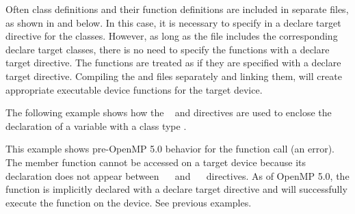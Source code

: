 
\begin{figure}[t!]
\end{figure}

Often class definitions and their function definitions are included in separate files,
as shown in  and  below.
In this case, it is necessary to specify in a declare target directive for the classes.
However, as long as the  file includes the corresponding declare target classes,
there is no need to specify the functions with a declare target directive.
The functions are treated as if they are specified with a declare target directive.
Compiling the  and  files 
separately and linking them, will create appropriate executable device functions for the target device.

\smallskip
{}
\smallskip
{}

\begin{figure}[t!]
\end{figure}

The following example shows how the ~  and  
  directives are used to enclose the declaration 
of a variable  with a class type . 

This example shows pre-OpenMP 5.0 behavior for the  function call (an error).
The member function  cannot be accessed on a target device because its 
declaration does not appear between ~~ and 
~~ directives. As of OpenMP 5.0, the
function is implicitly declared with a declare target directive 
and will successfully execute the function on the device.  See previous examples.

